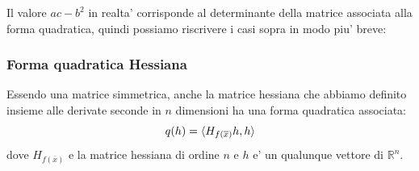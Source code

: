 \documentclass{report}
\begin{document}
Il valore $ ac-b^2 $ in realta' corrisponde al determinante della matrice associata alla forma quadratica, quindi possiamo riscrivere i casi sopra in modo piu' breve:

\subsubsection{Forma quadratica Hessiana}
Essendo una matrice simmetrica, anche la matrice hessiana che abbiamo definito insieme alle derivate seconde in $ n $ dimensioni ha una forma quadratica associata:
\[
  q(h) = \langle H_{f(\overline{x})}h, h \rangle
\]
dove $ H_{f(\overline{x})} $ e la matrice hessiana di ordine $ n $ e $ h $ e' un qualunque vettore di $ \mathbb{R}^n $.
\end{document}
